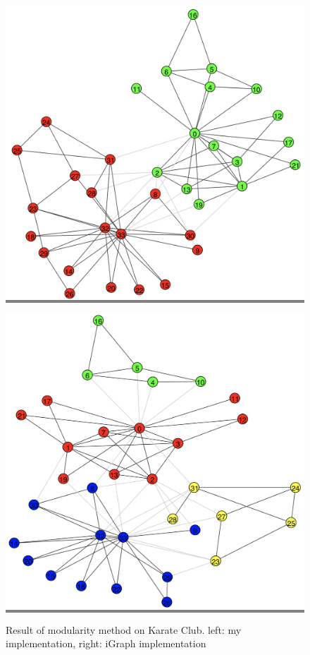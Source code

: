 \documentclass{article}
\begin{document}
\begin{figure}[h]
    \begin{minipage}{0.48\textwidth}
    \colorbox{gray}{\includegraphics[width=\linewidth]{./images/mod-j.png}}
    \end{minipage}
    \hspace{\fill}
    \begin{minipage}{0.48\textwidth}
    \colorbox{gray}{\includegraphics[width=\linewidth]{./images/mod-i.png}}
    \end{minipage}

    \caption{Result of modularity method on Karate Club. left: my implementation, right: iGraph implementation}
    \label{mod}
\end{figure}
\end{document}
